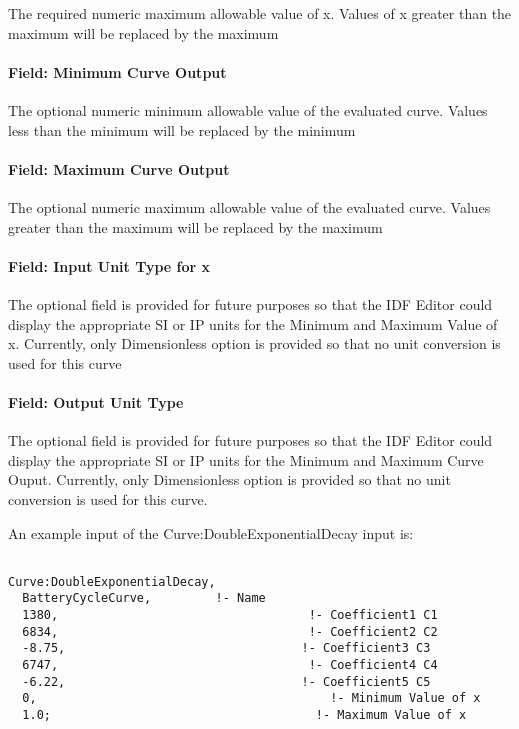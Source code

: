 The required numeric maximum allowable value of x. Values of x greater than the maximum will be replaced by the maximum

\paragraph{Field: Minimum Curve Output}\label{field-minimum-curve-output-17}

The optional numeric minimum allowable value of the evaluated curve. Values less than the minimum will be replaced by the minimum

\paragraph{Field: Maximum Curve Output}\label{field-maximum-curve-output-16}

The optional numeric maximum allowable value of the evaluated curve. Values greater than the maximum will be replaced by the maximum

\paragraph{Field: Input Unit Type for x}\label{field-input-unit-type-for-x-17}

The optional field is provided for future purposes so that the IDF Editor could display the appropriate SI or IP units for the Minimum and Maximum Value of x. Currently, only Dimensionless option is provided so that no unit conversion is used for this curve

\paragraph{Field: Output Unit Type}\label{field-output-unit-type-16}

The optional field is provided for future purposes so that the IDF Editor could display the appropriate SI or IP units for the Minimum and Maximum Curve Ouput. Currently, only Dimensionless option is provided so that no unit conversion is used for this curve.

An example input of the Curve:DoubleExponentialDecay input is:

\begin{lstlisting}

Curve:DoubleExponentialDecay,
  BatteryCycleCurve,         !- Name
  1380,                                   !- Coefficient1 C1
  6834,                                   !- Coefficient2 C2
  -8.75,                                 !- Coefficient3 C3
  6747,                                   !- Coefficient4 C4
  -6.22,                                 !- Coefficient5 C5
  0,                                         !- Minimum Value of x
  1.0;                                     !- Maximum Value of x
\end{lstlisting}

